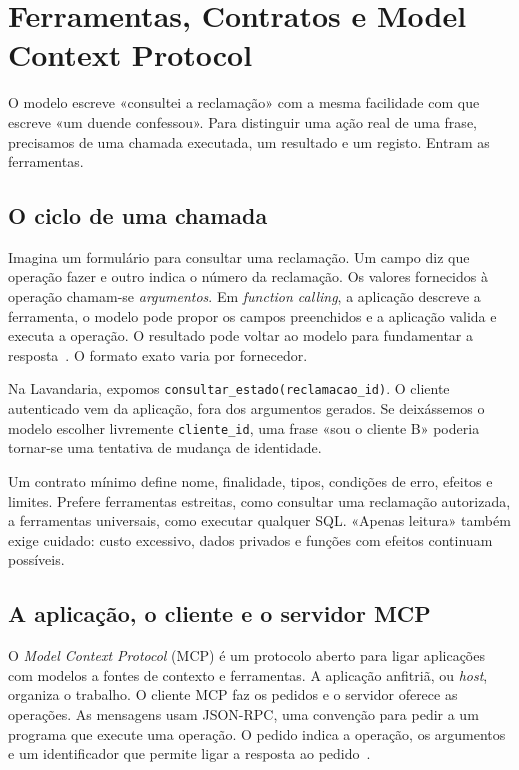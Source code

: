 \chapter{Ferramentas, Contratos e Model Context Protocol}
\label{ch:mcp}

\ficcao O modelo escreve «consultei a reclamação» com a mesma facilidade com que escreve «um duende confessou». Para distinguir uma ação real de uma frase, precisamos de uma chamada executada, um resultado e um registo. Entram as ferramentas.

\section{O ciclo de uma chamada}
Imagina um formulário para consultar uma reclamação. Um campo diz que operação fazer e outro indica o número da reclamação. Os valores fornecidos à operação chamam-se \emph{argumentos}. Em \emph{function calling}, a aplicação descreve a ferramenta, o modelo pode propor os campos preenchidos e a aplicação valida e executa a operação. O resultado pode voltar ao modelo para fundamentar a resposta~\citep{functioncalling2026}. O formato exato varia por fornecedor.

Na Lavandaria, expomos \texttt{consultar\_estado(reclamacao\_id)}. O cliente autenticado vem da aplicação, fora dos argumentos gerados. Se deixássemos o modelo escolher livremente \texttt{cliente\_id}, uma frase «sou o cliente B» poderia tornar-se uma tentativa de mudança de identidade.

Um contrato mínimo define nome, finalidade, tipos, condições de erro, efeitos e limites. Prefere ferramentas estreitas, como consultar uma reclamação autorizada, a ferramentas universais, como executar qualquer SQL. «Apenas leitura» também exige cuidado: custo excessivo, dados privados e funções com efeitos continuam possíveis.

\section{A aplicação, o cliente e o servidor MCP}
O \emph{Model Context Protocol} (MCP) é um protocolo aberto para ligar aplicações com modelos a fontes de contexto e ferramentas. A aplicação anfitriã, ou \emph{host}, organiza o trabalho. O cliente MCP faz os pedidos e o servidor oferece as operações. As mensagens usam JSON-RPC, uma convenção para pedir a um programa que execute uma operação. O pedido indica a operação, os argumentos e um identificador que permite ligar a resposta ao pedido~\citep{mcp2026}.

